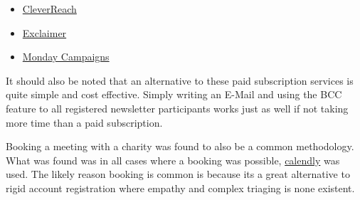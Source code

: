 \documentclass[11pt,a4paper]{article}
\begin{document}
\begin{itemize}
    \item \href{https://www.cleverreach.com/en/newsletter-tool/creating-and-designing-newsletters/?tl=o8ejlo-aw_uk_cn&gad_source=1&gad_campaignid=1370877092&gbraid=0AAAAADj-Y5p11HESNGlfDIL4UX7zsALFv&gclid=CjwKCAjwxITRBhBYEiwA6mZm7ZlYPj1hoQf-Fzp6Ay-qqrejPVhJTuu8OYbZEhog0A4dmfQC6n6xlBoCZxUQAvD_BwE}{CleverReach}
    \item \href{https://exclaimer.com/lp/14-day-free-trial/?hstk_creative=810959687171&hstk_campaign=23892133625&hstk_network=googleAds&creative=810959687171&keyword=email%20brand%20consistency&matchtype=b&network=g&device=c&utm_term=email%20brand%20consistency&utm_campaign=UK%20%7C%20Search%20%7C%20Generic%20%7C%20Broad%20Match%20A%2FB%2FC%20Landing%20Page%20Test&utm_source=adwords-search&utm_medium=cpc&utm_content=Broad%20-%20Brand%20Identity&hsa_acc=4500841410&hsa_cam=23892133625&hsa_grp=195322110445&hsa_ad=810959687171&hsa_src=g&hsa_tgt=kwd-2424627345829&hsa_kw=email%20brand%20consistency&hsa_mt=b&hsa_net=adwords&hsa_ver=3&gad_source=1&gad_campaignid=23892133625&gbraid=0AAAAADzh7UANuNVAaIuF3fxvl9toXU9L-&gclid=CjwKCAjwxITRBhBYEiwA6mZm7UwT0Ct1B1Qu8LeeRH96L80FVK0YAwWXM3-chf2Cw3-fzRebgScf5hoCSUwQAvD_BwE}{Exclaimer}
    \item \href{https://monday.com/crm/lp/campaigns?cq_src=google_ads&cq_cmp=23044226584&cq_term=email%20marketing%20software&cq_plac=&cq_net=g&cq_plt=gp&utm_medium=cpc&utm_source=adwordssearch&utm_campaign=gb-en-prm-workos-monday_campaigns-email_marketing-h-search-desktop-core-aw&utm_keyword=email%20marketing%20software&utm_match_type=p&cluster=crm_industries&subcluster=crm_healthcare&ati=&utm_adgroup=email%20marketing&utm_banner=775017905004&gad_source=1&gad_campaignid=23044226584&gbraid=0AAAAADeiQJuzMvjpNP5Fb8wJ0IXbxiNiK&gclid=CjwKCAjwxITRBhBYEiwA6mZm7Z7wvFhfbakc2QlzwoKGuzz8tRepHgZ_hfrbt0brv2AbROvnt8Z1aRoCZQ0QAvD_BwE}{Monday Campaigns}

\end{itemize}

It should also be noted that an alternative to these paid subscription services is quite simple and cost effective. Simply writing an E-Mail and using the BCC feature to all registered newsletter participants works just as well if not taking more time than a paid subscription.  

\hfill \break
Booking a meeting with a charity was found to also be a common methodology. What was found was in all cases where a booking was possible, \href{https://calendly.com/}{calendly} was used. The likely reason booking is common is because its a great alternative to rigid account registration where empathy and complex triaging is none existent.  
\end{document}
